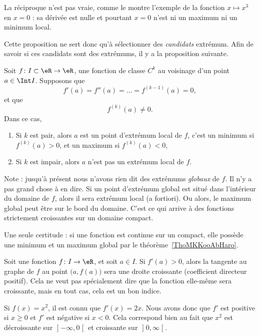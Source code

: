 La réciproque n'est pas vraie, comme le montre l'exemple de la fonction \( x\mapsto x^3\) en \( x=0\) : sa dérivée est nulle et pourtant \( x=0\) n'est ni un maximum ni un minimum local.

Cette proposition ne sert donc qu'à sélectionner des \emph{candidats} extrémum. Afin de savoir si ces candidats sont des extrémums, il y a la proposition suivante.
\begin{proposition}     \label{PROPooCXHPooSlRsEJ}
	Soit \( f\colon I\subset \eR\to \eR\), une fonction de classe \( C^k\) au voisinage d'un point \( a\in\Int I\). Supposons que
	\begin{equation}
		f'(a)=f''(a)=\ldots=f^{(k-1)}(a)=0,
	\end{equation}
	et que
	\begin{equation}
		f^{(k)}(a)\neq 0.
	\end{equation}
	Dans ce cas,
	\begin{enumerate}
		\item
		      Si \( k\) est pair, alors \( a\) est un point d'extrémum local de \( f\), c'est un minimum si \( f^{(k)}(a)>0\), et un maximum si \( f^{(k)}(a)<0\),
		\item
		      Si \( k\) est impair, alors \( a\) n'est pas un extrémum local de \( f\).
	\end{enumerate}
\end{proposition}

Note : jusqu'à présent nous n'avons rien dit des extrémums \emph{globaux} de \( f\). Il n'y a pas grand chose à en dire. Si un point d'extrémum global est situé dans l'intérieur du domaine de \( f\), alors il sera extrémum local (a fortiori). Ou alors, le maximum global peut être sur le bord du domaine. C'est ce qui arrive à des fonctions strictement croissantes sur un domaine compact.

Une seule certitude : si une fonction est continue sur un compact, elle possède une minimum et un maximum global par le théorème~\ref{ThoMKKooAbHaro}.

Soit une fonction \( f\colon I\to \eR\), et soit \( a\in I\). Si \( f'(a)>0\), alors la tangente au graphe de \( f\) au point \( \big( a,f(a) \big)\) sera une droite croissante (coefficient directeur positif). Cela ne veut pas spécialement dire que la fonction elle-même sera croissante, mais en tout cas, cela est un bon indice.

\begin{example}
	Si \( f(x)=x^2\), il est connu que \( f'(x)=2x\). Nous avons donc que \( f'\) est positive si \( x\geq 0\) et \( f'\) est négative si \( x<0\). Cela correspond bien au fait que \( x^2\) est décroissante sur \( \mathopen] -\infty , 0 \mathclose[\) et croissante sur \( \mathopen] 0 , \infty \mathclose[\).
\end{example}

